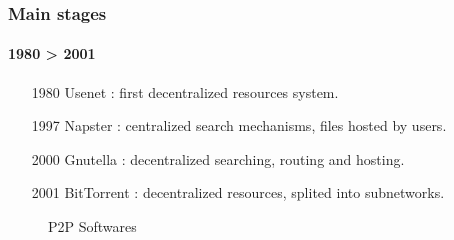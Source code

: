     \begin{frame}
      \frametitle{Main stages}
      \framesubtitle{1980 > 2001}
      \begin{enumerate}
      \item[1980] Usenet : first decentralized resources system.
      \item[1997] Napster : centralized search mechanisms, files hosted by users.
      \item[2000] Gnutella : decentralized searching, routing and hosting.
      \item[2001] BitTorrent : decentralized resources, splited into subnetworks.
      \end{enumerate}
      \begin{figure}
        \hfill
        \hfill
        \hfill
        \hfill
        \caption{P2P Softwares}
      \end{figure}
    \end{frame}
    
